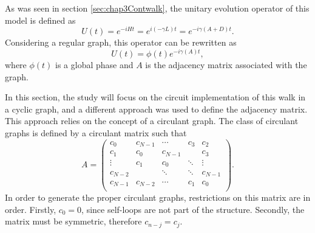 \documentclass[../../dissertation.tex]{subfiles}
\begin{document}
As was seen in section \ref{sec:chap3Contwalk}, the unitary evolution operator
of this model is defined as
\begin{equation}
        U(t) = e^{-iHt} = e^{i(-\gamma L)t} = e^{-i\gamma(A+D)t}.
\end{equation}
Considering a regular graph, this operator can be rewritten as 
\begin{equation}
	U(t) = \phi(t) e^{-i\gamma(A)t},
\end{equation}
where $\phi(t)$ is a global phase and $A$ is the adjacency matrix associated
with the graph.\par

In this section, the study will focus on the circuit implementation of this walk in a
cyclic graph, and a different approach was used to define the adjacency matrix.
This approach relies on the concept of a circulant graph. The class of circulant
graphs is defined by a circulant matrix such that
\begin{equation}
A = 
	\begin{pmatrix}
		c_0&c_{N-1}& \cdots&c_3&c_2 \\
		c_1&c_0& c_{N-1}& &c_{3} \\
		\vdots & c_1 & c_0 &\ddots & \vdots\\
		c_{N-2}& & \ddots&\ddots &c_{N-1}\\
		c_{N-1} & c_{N-2} & \cdots & c_1 & c_0\\
	\end{pmatrix}.
\label{eq:adjCirculant}
\end{equation}
In order to generate the proper circulant graphs, restrictions on this matrix
are in order. Firstly, $c_0=0$, since self-loops are not part of the structure.
Secondly, the matrix must be symmetric, therefore $c_{n-j} = c_j$.\par
\end{document}
